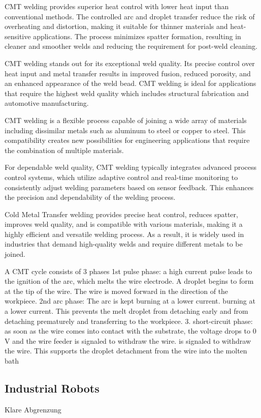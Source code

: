 CMT welding provides superior heat control with lower heat input than conventional methods. The controlled arc and droplet transfer reduce the risk of overheating and distortion, making it suitable for thinner materials and heat-sensitive applications. The process minimizes spatter formation, resulting in cleaner and smoother welds and reducing the requirement for post-weld cleaning.

CMT welding stands out for its exceptional weld quality. Its precise control over heat input and metal transfer results in improved fusion, reduced porosity, and an enhanced appearance of the weld bead. CMT welding is ideal for applications that require the highest weld quality which includes structural fabrication and automotive manufacturing.

CMT welding is a flexible process capable of joining a wide array of materials including dissimilar metals such as aluminum to steel or copper to steel. This compatibility creates new possibilities for engineering applications that require the combination of multiple materials.

For dependable weld quality, CMT welding typically integrates advanced process control systems, which utilize adaptive control and real-time monitoring to consistently adjust welding parameters based on sensor feedback. This enhances the precision and dependability of the welding process.

Cold Metal Transfer welding provides precise heat control, reduces spatter, improves weld quality, and is compatible with various materials, making it a highly efficient and versatile welding process. As a result, it is widely used in industries that demand high-quality welds and require different metals to be joined.

A CMT cycle consists of 3 phases 
1st pulse phase: a high current pulse leads to the ignition of the arc, 
which melts the wire electrode. A droplet begins to form at the 
tip of the wire. The wire is moved forward in the direction of the 
workpiece.
2nd arc phase: The arc is kept burning at a lower current. 
burning at a lower current. This prevents the melt droplet from detaching early and 
from detaching prematurely and transferring to the workpiece.
3. short-circuit phase: as soon as the wire comes into contact with the substrate, 
the voltage drops to 0 V and the wire feeder is signaled to withdraw the wire. 
is signaled to withdraw the wire. This supports the droplet detachment 
from the wire into the molten bath 

\subsection{Industrial Robots}
Klare Abgrenzung

